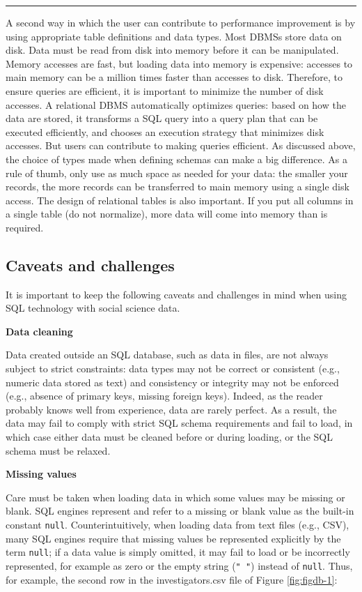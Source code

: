 \documentclass[]{krantz}
\begin{document}
\begin{center}\rule{0.5\linewidth}{\linethickness}\end{center}

A second way in which the user can contribute to performance improvement
is by using appropriate table definitions and data types. Most DBMSs
store data on disk. Data must be read from disk into memory before it
can be manipulated. Memory accesses are fast, but loading data into
memory is expensive: accesses to main memory can be a million times
faster than accesses to disk. Therefore, to ensure queries are
efficient, it is important to minimize the number of disk accesses. A
relational DBMS automatically optimizes queries: based on how the data
are stored, it transforms a SQL query into a query plan that can be
executed efficiently, and chooses an execution strategy that minimizes
disk accesses. But users can contribute to making queries efficient. As
discussed above, the choice of types made when defining schemas can make
a big difference. As a rule of thumb, only use as much space as needed
for your data: the smaller your records, the more records can be
transferred to main memory using a single disk access. The design of
relational tables is also important. If you put all columns in a single
table (do not normalize), more data will come into memory than is
required.

\subsection{Caveats and challenges}\label{caveats-and-challenges}

It is important to keep the following caveats and challenges in mind
when using SQL technology with social science data.

\textbf{Data cleaning}

Data created outside an SQL database, such as data in files, are not
always subject to strict constraints: data types may not be correct or
consistent (e.g., numeric data stored as text) and consistency or
integrity may not be enforced (e.g., absence of primary keys, missing
foreign keys). Indeed, as the reader probably knows well from
experience, data are rarely perfect. As a result, the data may fail to
comply with strict SQL schema requirements and fail to load, in which
case either data must be cleaned before or during loading, or the SQL
schema must be relaxed.

\textbf{Missing values}

Care must be taken when loading data in which some values may be missing
or blank. SQL engines represent and refer to a missing or blank value as
the built-in constant \texttt{null}. Counterintuitively, when loading
data from text files (e.g., CSV), many SQL engines require that missing
values be represented explicitly by the term \texttt{null}; if a data
value is simply omitted, it may fail to load or be incorrectly
represented, for example as zero or the empty string (\texttt{"\ "})
instead of \texttt{null}. Thus, for example, the second row in the
investigators.csv file of Figure \ref{fig:figdb-1}:
\end{document}
